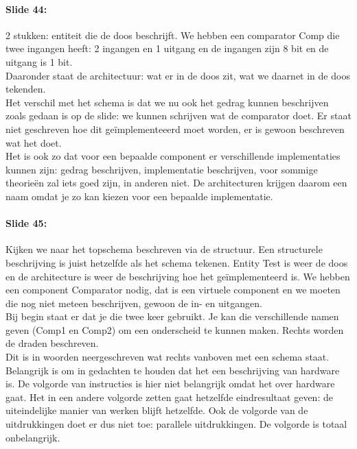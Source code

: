 \documentclass[10pt,a4paper]{book}
\begin{document}
\paragraph{Slide 44:} 2 stukken: entiteit die de doos beschrijft. We hebben een comparator Comp die twee ingangen heeft: 2 ingangen en 1 uitgang en de ingangen zijn 8 bit en de uitgang is 1 bit.\\
Daaronder staat de architectuur: wat er in de doos zit, wat we daarnet in de doos tekenden.\\
Het verschil met het schema is dat we nu ook het gedrag kunnen beschrijven zoals gedaan is op de slide: we kunnen schrijven wat de comparator doet. Er staat niet geschreven hoe dit ge\"implementeeerd moet worden, er is gewoon beschreven wat het doet. \\
Het is ook zo dat voor een bepaalde component er verschillende implementaties kunnen zijn: gedrag beschrijven, implementatie beschrijven, voor sommige theorie\"en zal iets goed zijn, in anderen niet. De architecturen krijgen daarom een naam omdat je zo kan kiezen voor een bepaalde implementatie.

\paragraph{Slide 45:} Kijken we naar het topschema beschreven via de structuur. Een structurele beschrijving is juist hetzelfde als het schema tekenen. Entity Test is weer de doos en de architecture is weer de beschrijving hoe het ge\"implementeerd is. We hebben een component Comparator nodig, dat is een virtuele component en we moeten die nog niet meteen beschrijven, gewoon de in- en uitgangen.\\
Bij begin staat er dat je die twee keer gebruikt. Je kan die verschillende namen geven (Comp1 en Comp2) om een onderscheid te kunnen maken. Rechts worden de draden beschreven. \\
Dit is in woorden neergeschreven wat rechts vanboven met een schema staat. \\
Belangrijk is om in gedachten te houden dat het een beschrijving van hardware is. De volgorde van instructies is hier niet belangrijk omdat het over hardware gaat. Het in een andere volgorde zetten gaat hetzelfde eindresultaat geven: de uiteindelijke manier van werken blijft hetzelfde. Ook de volgorde van de uitdrukkingen doet er dus niet toe: parallele uitdrukkingen. De volgorde is totaal onbelangrijk.
\end{document}
